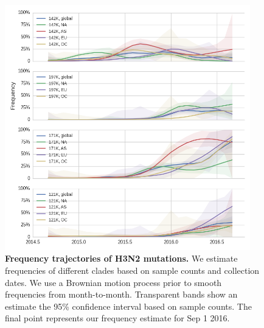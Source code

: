 \documentclass[11pt,oneside,letterpaper]{article}
\begin{document}
\begin{figure}[H]
	\centering
	\includegraphics[width=0.95\textwidth]{../figures/sep-2016/H3N2_mutations_all.png}
	\caption{\textbf{Frequency trajectories of H3N2 mutations.}
	We estimate frequencies of different clades based on sample counts and collection dates.
	We use a Brownian motion process prior to smooth frequencies from month-to-month.
	Transparent bands show an estimate the 95\% confidence interval based on sample counts.
	The final point represents our frequency estimate for Sep 1 2016.
	}
	\label{H3N2_mutations_all}
\end{figure}



\end{document}
